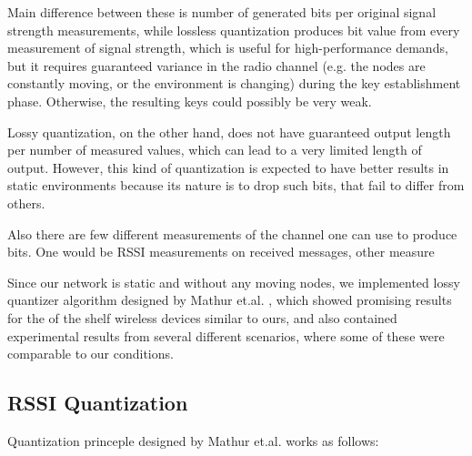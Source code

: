 \documentclass[
  digital, %
  table,   %
  nolof,     %
  nolot,     %
           oneside
]{fithesis3}
\begin{document}
    Main difference between these is number of generated bits per original signal strength measurements, while lossless quantization produces bit value from every measurement of signal strength, which is useful for high-performance demands, but it requires guaranteed variance in the radio channel (e.g. the nodes are constantly moving, or the environment is changing) during the key establishment phase. %
    Otherwise, the resulting keys could possibly be very weak. %

    Lossy quantization, on the other hand, does not have guaranteed output length per number of measured values, which can lead to a very limited length of output. However, this kind of quantization is expected to have better results in static environments %
    because its nature is to drop such bits, that fail to differ from others.

    Also there are few different measurements of the channel one can use to produce bits. One would be RSSI measurements on received messages, other measure %

    Since our network is static and without any moving nodes, we implemented lossy quantizer algorithm designed by Mathur et.al.%
    , which showed promising results for the of the shelf wireless devices similar to ours, and also contained experimental results from several different scenarios, where some of these were comparable to our conditions.



    \subsection{RSSI Quantization}
    Quantization princeple designed by Mathur et.al. %
     works as follows:
\end{document}
